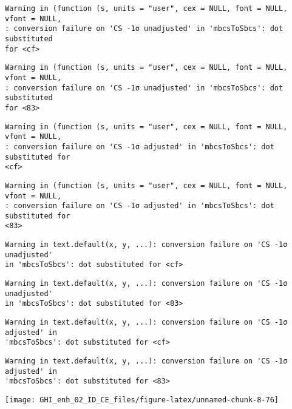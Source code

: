 \documentclass[
  10pt,
  a4paper,oneside]{article}
\begin{document}
\begin{verbatim}
Warning in (function (s, units = "user", cex = NULL, font = NULL, vfont = NULL,
: conversion failure on 'CS -1σ unadjusted' in 'mbcsToSbcs': dot substituted
for <cf>
\end{verbatim}

\begin{verbatim}
Warning in (function (s, units = "user", cex = NULL, font = NULL, vfont = NULL,
: conversion failure on 'CS -1σ unadjusted' in 'mbcsToSbcs': dot substituted
for <83>
\end{verbatim}

\begin{verbatim}
Warning in (function (s, units = "user", cex = NULL, font = NULL, vfont = NULL,
: conversion failure on 'CS -1σ adjusted' in 'mbcsToSbcs': dot substituted for
<cf>
\end{verbatim}

\begin{verbatim}
Warning in (function (s, units = "user", cex = NULL, font = NULL, vfont = NULL,
: conversion failure on 'CS -1σ adjusted' in 'mbcsToSbcs': dot substituted for
<83>
\end{verbatim}

\begin{verbatim}
Warning in text.default(x, y, ...): conversion failure on 'CS -1σ unadjusted'
in 'mbcsToSbcs': dot substituted for <cf>
\end{verbatim}

\begin{verbatim}
Warning in text.default(x, y, ...): conversion failure on 'CS -1σ unadjusted'
in 'mbcsToSbcs': dot substituted for <83>
\end{verbatim}

\begin{verbatim}
Warning in text.default(x, y, ...): conversion failure on 'CS -1σ adjusted' in
'mbcsToSbcs': dot substituted for <cf>
\end{verbatim}

\begin{verbatim}
Warning in text.default(x, y, ...): conversion failure on 'CS -1σ adjusted' in
'mbcsToSbcs': dot substituted for <83>
\end{verbatim}

\begin{center}\texttt{[image: GHI\_enh\_02\_ID\_CE\_files/figure-latex/unnamed-chunk-8-76]} \end{center}
\end{document}
